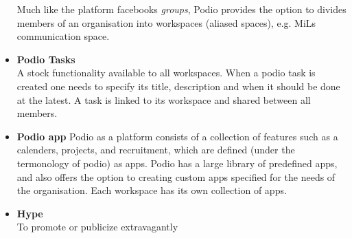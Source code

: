 \begin{itemize}
	Much like the platform facebooks \emph{groups}, Podio provides the option to divides members of an organisation into workspaces (aliased spaces), e.g. MiLs communication space.
	\item \textbf{Podio Tasks}\\
	A stock functionality available to all workspaces. When a podio task is created one needs to specify its title, description and when it should be done at the latest. A task is linked to its workspace and shared between all members.
	\item \textbf{Podio app}
	Podio as a platform consists of a collection of features such as a calenders, projects, and recruitment, which are defined (under the termonology of podio) as apps. Podio has a large library of predefined apps, and also offers the option to creating custom apps specified for the needs of the organisation. Each workspace has its own collection of apps.
	\item \textbf{Hype}\\
	To promote or publicize extravagantly

\end{itemize}
